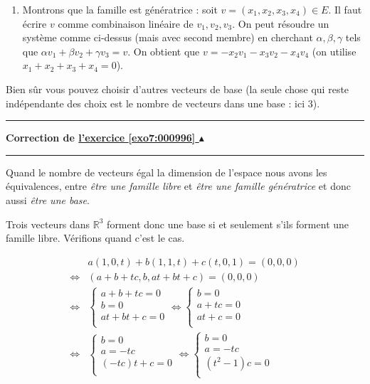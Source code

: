\documentclass[11pt,a4paper]{article}
\newcommand{\Rr}{\mathbb{R}} \newcommand{\R}{\mathbb{R}}
\newcounter{exo}
\newcommand{\correction}[1]{\hypertarget{cor7:#1}{}\label{cor7:#1}{\bf Correction de \hyperlink{exo7:#1}{l'exercice \ref{exo7:#1} $\blacktriangle$}}\vspace{1mm}\hrule\vspace{1mm}}
\newcommand{\fincorrection}{\vspace{1mm}\hrule\vspace*{7mm}}
\begin{document}
\begin{enumerate}
\begin{enumerate}
\item Montrons que la famille est g\'en\'eratrice : soit $v =
  (x_1,x_2,x_3,x_4) \in E$. Il faut \'ecrire $v$ comme combinaison
  lin\'eaire de $v_1,v_2,v_3$.  On peut r\'esoudre un syst\`eme comme
  ci-dessus (mais avec second membre) en cherchant
  $\alpha,\beta,\gamma$ tels que $\alpha v_1+\beta v_2+\gamma v_3=v$.
  On obtient que $v = -x_2v_1-x_3v_2-x_4v_4$ (on utilise
  $x_1+x_2+x_3+x_4=0$).
  \end{enumerate}
  
  Bien s\^ur vous pouvez choisir d'autres vecteurs de base (la seule
  chose qui reste ind\'ependante des choix est le nombre de vecteurs
  dans une base : ici $3$).
\end{enumerate}
\fincorrection
\correction{000996}

Quand le nombre de vecteurs égal la dimension de l'espace  nous avons les équivalences, entre 
\emph{être une famille libre} et \emph{être une famille génératrice} et donc aussi \emph{être une base}.

Trois vecteurs dans $\Rr^3$ forment donc une base si et seulement s'ils forment une famille libre.
Vérifions quand c'est le cas.


\begin{align*}
      & a (1, 0, t) + b (1, 1, t) + c (t,0,1) = (0,0,0) \\
\iff  & (a+b+tc,b,at+bt+c)=(0,0,0) \\
\iff  & \begin{cases}
         a+b+tc = 0 \\
         b = 0 \\
         at+bt+c = 0 \\
        \end{cases} 
\iff \begin{cases}
         b = 0 \\
         a+tc = 0 \\
         at+c = 0 \\
        \end{cases} \\
\iff & \begin{cases}
         b = 0 \\
         a=-tc \\
         (-tc)t+c = 0 \\
        \end{cases} 
\iff \begin{cases}
         b = 0 \\
         a=-tc \\
         (t^2-1)c = 0 \\
        \end{cases} \\
\end{align*}
\end{document}
